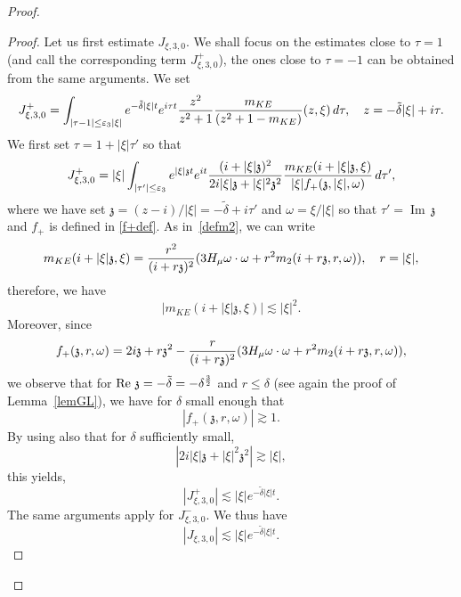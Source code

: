 \documentclass[11pt]{amsart}
\numberwithin{equation}{section}
\newcommand{\eps}{\varepsilon}
\begin{document}
\begin{proof}
\begin{proof}
   
   Let us first estimate $ J_{\xi, 3, 0} $. 
    We shall focus on the estimates close to $\tau= 1$ (and call the corresponding term $J_{\xi, 3, 0}^+ $), the ones close to $\tau=-1$ can be obtained from the same arguments.
     We set
     $$ J_{\xi, 3, 0}^+  =   \int_{ | \tau- 1 | \leq \eps_{3} | \xi|}  e^{- \tilde \delta | \xi | t }  e^{i \tau t }
      {z^2 \over z^2+1} { m_{KE} \over (z^2+ 1 - m_{KE})}(z, \xi) \, d\tau
     , \quad z= - \tilde \delta |\xi|  + i \tau.$$
     We first set $\tau= 1 + | \xi | \tau'$ so that 
     $$ J_{\xi, 3, 0}^+ =  | \xi|  \int_{|\tau' | \leq \eps_{3}} e^{ | \xi | \mathfrak{z} t }  e^{i t} { ( i + | \xi | \mathfrak{z})^2 \over   2 i | \xi | \mathfrak{z} + |\xi|^2 \mathfrak{z}^2}
      { m_{KE} ( i + |\xi| \mathfrak{z}, \xi) \over | \xi| f_+ (\mathfrak{z}, |\xi|, \omega)}\, d\tau',
      $$
      where we have set $\mathfrak{z}=  (z- i)/|\xi| = -\tilde \delta + i \tau'$ and $\omega = \xi / |\xi|$ so that $\tau'= {\operatorname{Im}}\, \mathfrak{z}$ 
      and  $f_{+}$ is defined in \eqref{f+def}. %
As in~\eqref{defm2}, we can write
       $$ m_{KE} ( i + |\xi| \mathfrak{z}, \xi)  ={ r^2  \over (i + r \mathfrak{z})^2}(3 H_{\mu}\omega \cdot \omega  +  r^2 m_{2}(i+ r \mathfrak{z}, r, \omega)), \quad r= |\xi|, $$
       therefore, we have 
       $$ |m_{KE} ( i + |\xi| \mathfrak{z}, \xi)| \lesssim |\xi|^2.$$
      Moreover,  since 
       $$ f_+ (\mathfrak{z}, r, \omega)= 2 i \mathfrak{z} + r \mathfrak{z}^2 -
        { r\over ( i + r\mathfrak{z} )^2} ( 3 H_{\mu}\omega \cdot \omega +  r^2  m_{2}(i+ r\mathfrak{z}, r, \omega)),$$
        we observe that for  $\operatorname{Re} \, \mathfrak{z} = - \tilde \delta= - \delta^{ 3 \over 2}$ and $r \leq \delta$ (see again the proof of Lemma~\ref{lemGL}), we have for
         $\delta$ small enough that
      $$| f_+ (\mathfrak{z}, r, \omega)| \gtrsim 1.$$
   By using also that for $\delta$ sufficiently small, 
   $$ \left| 2 i | \xi | \mathfrak{z} + |\xi|^2 \mathfrak{z}^2 \right| \gtrsim  |\xi|,$$
      this yields,
   $$
     |J_{\xi, 3, 0}^+| \lesssim | \xi | e^{ -\tilde \delta | \xi| t}.
    $$
The same arguments apply for $J_{\xi, 3, 0}^-$. We thus have  
    \begin{equation}
    \label{J3+}
      |J_{\xi, 3, 0}| \lesssim | \xi |e^{ -\tilde \delta | \xi| t} .
  \end{equation}   
  

\end{proof}
\end{proof}
\end{document}
